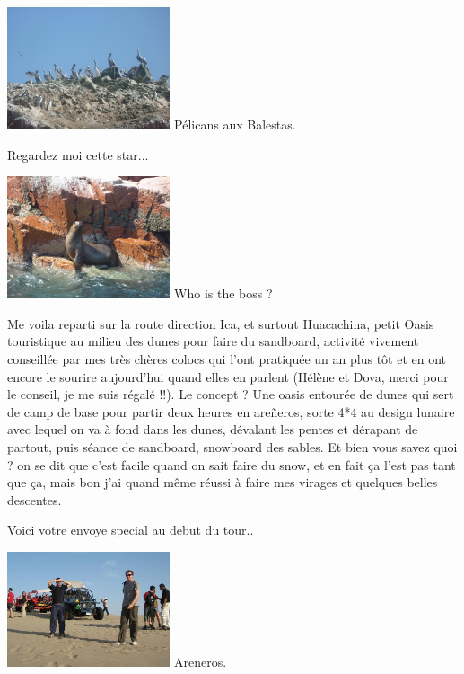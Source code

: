 \begin{multicols}{2}
\hspace*{-0.65cm}
\includegraphics[width=4.8cm]{articles/Cote-du-sud/1255997482Hoy0.jpg}
Pélicans aux Balestas.


Regardez moi cette star...

\hspace*{-0.65cm}
\includegraphics[width=4.8cm]{articles/Cote-du-sud/1255997520UtdU.jpg}
Who is the boss ?


Me voila reparti sur la route direction Ica, et surtout Huacachina, petit Oasis touristique au milieu des dunes pour faire du sandboard, activité vivement conseillée par mes très chères colocs qui l'ont pratiquée un an plus tôt et en ont encore le sourire aujourd'hui quand elles en parlent (Hélène et Dova, merci pour le conseil, je me suis régalé !!). Le concept ? Une oasis entourée de dunes qui sert de camp de base pour partir deux heures en areñeros, sorte 4*4 au design lunaire avec lequel on va à fond dans les dunes, dévalant les pentes et dérapant de partout, puis séance de sandboard, snowboard des sables. Et bien vous savez quoi ? on se dit que c'est facile quand on sait faire du snow, et en fait ça l'est pas tant que ça, mais bon j'ai quand même réussi à faire mes virages et quelques belles descentes.

Voici votre envoye special au debut du tour..

\hspace*{-0.65cm}
\includegraphics[width=4.8cm]{articles/Cote-du-sud/1255997503PLr1.jpg}
Areneros.



\end{multicols}
